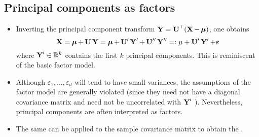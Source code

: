 \subsection*{Principal components as factors}
\begin{itemize}[leftmargin=*]
    \item Inverting the principal component transform $\Y=\U^{\T}(\X-\mmu)$, one obtains
$$
\X=\mmu+\U \Y=\mmu+\U^{\prime} \Y^{\prime}+\U^{\prime \prime} \Y^{\prime \prime}=: \mu+\U^{\prime} \Y^{\prime}+\vect{\varepsilon}
$$
where $\Y^{\prime} \in \mathbb{R}^{k}$ contains the first $k$ principal components. This is reminiscent of the basic factor model.
    \item Although $\varepsilon_{1}, \ldots, \varepsilon_{d}$ will tend to have small variances, the assumptions of the factor model are generally violated (since they need not have a diagonal covariance matrix and need not be uncorrelated with $\Y^{\prime}$ ). Nevertheless, principal components are often interpreted as factors.
    \item The same can be applied to the sample covariance matrix to obtain the .
\end{itemize}
